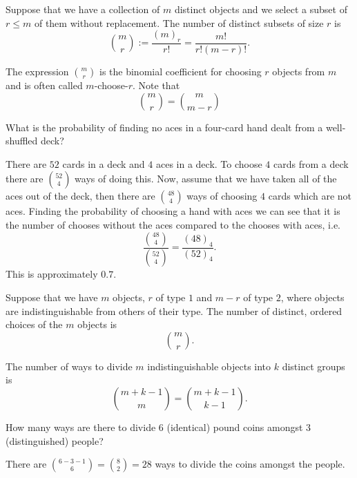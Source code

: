 \documentclass[10pt, a4paper]{article}
\begin{document}
\begin{countprinc}
    Suppose that we have a collection of $m$ distinct objects and we select a subset of $r \leq m$ of them without replacement. The number of distinct subsets of size $r$ is
    \[
    \binom{m}{r} := \frac{(m)_r}{r!} = \frac{m!}{r!(m - r)!}.
    \]
\end{countprinc}

The expression $\binom{m}{r}$ is the binomial coefficient for choosing $r$ objects from $m$ and is often called $m$-choose-$r$. Note that
\[
\binom{m}{r} = \binom{m}{m - r}
\]

\begin{example}
    What is the probability of finding no aces in a four-card hand dealt from a well-shuffled deck?

    There are $52$ cards in a deck and $4$ aces in a deck. To choose $4$ cards from a deck there are $\binom{52}{4}$ ways of doing this. Now, assume that we have taken all of the aces out of the deck, then there are $\binom{48}{4}$ ways of choosing $4$ cards which are not aces. Finding the probability of choosing a hand with aces we can see that it is the number of chooses without the aces compared to the chooses with aces, i.e.
    \[
    \frac{\binom{48}{4}}{\binom{52}{4}} = \frac{(48)_4}{(52)_4}.
    \]
    This is approximately $0.7$.
\end{example}

\begin{countprinc}
    Suppose that we have $m$ objects, $r$ of type $1$ and $m - r$ of type $2$, where objects are indistinguishable from others of their type. The number of distinct, ordered choices of the $m$ objects is
    \[
    \binom{m}{r}.
    \]
\end{countprinc}

\begin{countprinc}
    The number of ways to divide $m$ indistinguishable objects into $k$ distinct groups is
    \[
    \binom{m + k - 1}{m} = \binom{m + k - 1}{k - 1}.
    \]
\end{countprinc}

\begin{example}
    How many ways are there to divide $6$ (identical) pound coins amongst $3$ (distinguished) people?

    There are $\binom{6 - 3 - 1}{6} = \binom{8}{2} = 28$ ways to divide the coins amongst the people.
\end{example}
\end{document}
